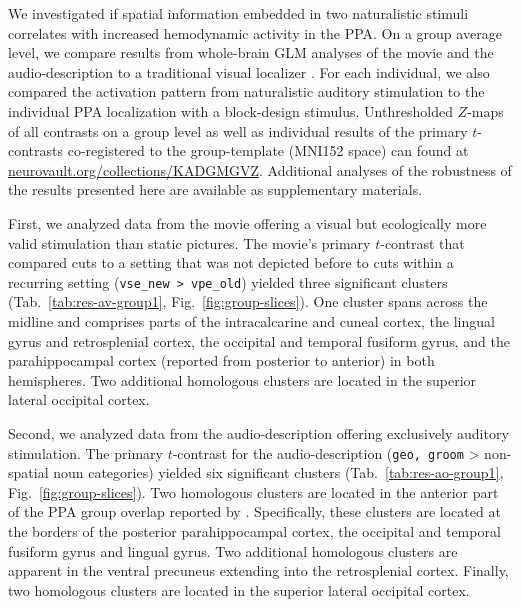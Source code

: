 \documentclass[english]{article}
\begin{document}
We investigated if spatial information embedded in two naturalistic stimuli
correlates with increased hemodynamic activity in the PPA.
On a group average level, we compare results from whole-brain GLM
analyses of the movie and the audio-description to a
traditional visual localizer \citep{sengupta2016extension}.
For each individual, we also compared the activation pattern from
naturalistic auditory stimulation to the individual PPA localization
with a block-design stimulus.
Unthresholded $Z$-maps of all contrasts on a group level as well as individual
results of the primary $t$-contrasts co-registered to the group-template (MNI152
space) can found at
\href{https://neurovault.org/collections/KADGMGVZ/}{\url{neurovault.org/collections/KADGMGVZ}}.
Additional analyses of the robustness of the results presented here
are available as supplementary materials.

First, we analyzed data from the movie offering a visual but ecologically more
valid stimulation than static pictures.
The movie's primary $t$-contrast that compared cuts to a setting that was not
depicted before to cuts within a recurring setting (\texttt{vse\_new >
vpe\_old}) yielded three significant clusters (Tab.~\ref{tab:res-av-group1},
Fig.~\ref{fig:group-slices}).
One cluster spans across the midline and comprises parts of the intracalcarine
and cuneal cortex, the lingual gyrus and retrosplenial cortex, the occipital and
temporal fusiform gyrus, and the parahippocampal cortex (reported from posterior
to anterior) in both hemispheres.
Two additional homologous clusters are located in the superior lateral occipital
cortex.

Second, we analyzed data from the audio-description offering exclusively
auditory stimulation.
The primary $t$-contrast for the audio-description (\texttt{geo, groom} >
non-spatial noun categories) yielded six significant clusters
(Tab.~\ref{tab:res-ao-group1}, Fig.~\ref{fig:group-slices}).
Two homologous clusters are located in the anterior part of the PPA group
overlap reported by \cite{sengupta2016extension}.
Specifically, these clusters are located at the borders of the posterior
parahippocampal cortex, the occipital and temporal fusiform gyrus and lingual
gyrus.
Two additional homologous clusters are apparent in the ventral precuneus
extending into the retrosplenial cortex.
Finally, two homologous clusters are located in the superior lateral occipital
cortex.
\end{document}
